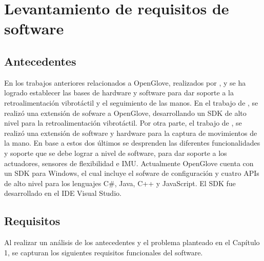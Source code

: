 \section{Levantamiento de requisitos de software}

\subsection{Antecedentes}
En los trabajos anteriores relacionados a OpenGlove, realizados por \cite{tesis-monsalve-rodrigo}, \cite{tesis-meneses-sebastian} y \cite{tesis-cerda-rodrigo} se ha logrado establecer las bases de hardware y software para dar soporte a la retroalimentación vibrotáctil y el seguimiento de las manos. En el trabajo de \cite{tesis-meneses-sebastian}, se realizó una extensión de sofware a OpenGlove, desarrollando un SDK de alto nivel para la retroalimentación vibrotáctil. Por otra parte, el trabajo de \cite{tesis-cerda-rodrigo}, se realizó una extensión de software y hardware para la captura de movimientos de la mano. En base a estos dos últimos se desprenden las diferentes funcionalidades y soporte que se debe lograr a nivel de software, para dar soporte a los actuadores, sensores de flexibilidad e IMU. Actualmente OpenGlove cuenta con un SDK para Windows, el cual incluye el sofware de configuración y cuatro APIs de alto nivel para los lenguajes C\#, Java, C++ y JavaScript. El SDK fue desarrollado en el IDE Visual Studio.


\subsection{Requisitos}

Al realizar un análisis de los antecedentes y el problema planteado en el Capítulo 1, se capturan los siguientes requisitos funcionales del software.

